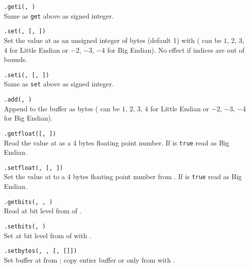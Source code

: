 \hangpar {}\texttt{.geti(}\texttt{, }\texttt{)} \\
Same as \texttt{get} above as signed integer.

\hangpar {}\texttt{.set(}\texttt{, }\texttt{[, }\texttt{])} \\
Set the value at  as an unsigned integer of  bytes (default 1) with  ( can be $1$, $2$, $3$, $4$ for Little Endian or $-2$, $-3$, $-4$ for Big Endian). No effect if indices are out of bounds.

\hangpar {}\texttt{.seti(}\texttt{, }\texttt{[, }\texttt{])} \\
Same as \texttt{set} above as signed integer.

\hangpar {}\texttt{.add(}\texttt{, }\texttt{)} \\
Append  to the  buffer as  bytes ( can be $1$, $2$, $3$, $4$ for Little Endian or $-2$, $-3$, $-4$ for Big Endian).

\hangpar {}\texttt{.getfloat(}\texttt{[, }\texttt{])} \\
Read the value at  as a 4 bytes floating point number. If  is \texttt{true} read as Big Endian.

\hangpar {}\texttt{.setfloat(}\texttt{, }\texttt{[, }\texttt{])} \\
Set the value at  to a 4 bytes floating point number from . If  is \texttt{true} read as Big Endian.

\hangpar {}\texttt{.getbits(}\texttt{, }\texttt{, }\texttt{)} \\
Read at bit level from  of .

\hangpar {}\texttt{.setbits(}\texttt{, }\texttt{)} \\
Set at bit level from  of  with .

\hangpar {}\texttt{.setbytes(}\texttt{, }\texttt{, [}\texttt{, [}\texttt{]])}\\
Set buffer at  from ; copy entier buffer or only from  with .

